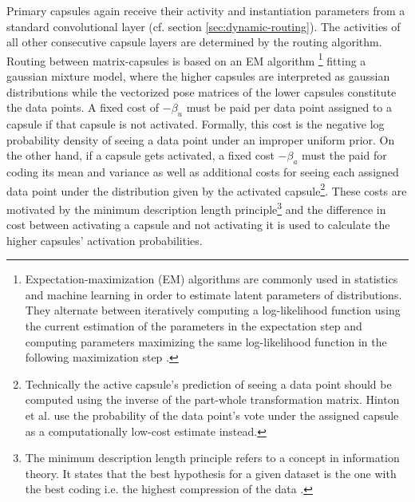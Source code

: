 Primary capsules again receive their activity and instantiation parameters from a standard convolutional layer (cf. section \ref{sec:dynamic-routing}). The activities of all other consecutive capsule layers are determined by the routing algorithm. Routing between matrix-capsules is based on an EM algorithm \footnote{Expectation-maximization (EM) algorithms are commonly used in statistics and machine learning in order to estimate latent parameters of distributions. They alternate between iteratively computing a log-likelihood function using the current estimation of the parameters in the expectation step and computing parameters maximizing the same log-likelihood function in the following maximization step \cite{dempster1977maximum}.} fitting a gaussian mixture model, where the higher capsules are interpreted as gaussian distributions while the vectorized pose matrices of the lower capsules constitute the data points. A fixed cost of $-\beta_u$ must be paid per data point assigned to a capsule if that capsule is not activated. Formally, this cost is the negative log probability density of seeing a data point under an improper uniform prior. On the other hand, if a capsule gets activated, a fixed cost $-\beta_a$ must the paid for coding its mean and variance as well as additional costs for seeing each assigned data point under the distribution given by the activated capsule\footnote{ Technically the active capsule's prediction of seeing a data point should be computed using the inverse of the part-whole transformation matrix. Hinton et al. use the probability of the data point's vote under the assigned capsule as a computationally low-cost estimate instead.}. These costs are motivated by the minimum description length principle\footnote{The minimum description length principle refers to a concept in information theory. It states that the best hypothesis for a given dataset is the one with the best coding i.e. the highest compression of the data \cite{rissanen1978modeling}.} and the difference in cost between activating a capsule and not activating it is used to calculate the higher capsules' activation probabilities.

